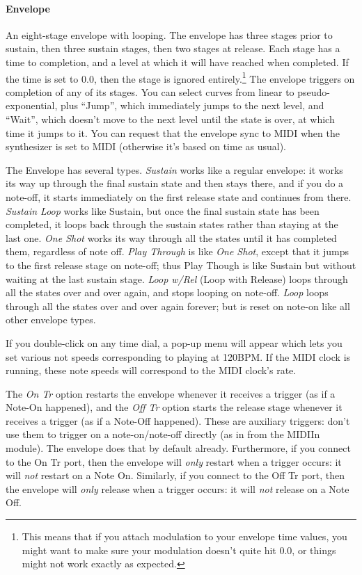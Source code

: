 \documentclass{article}
\begin{document}
\paragraph{Envelope}  An eight-stage envelope with looping.  The envelope has three stages prior to sustain, then three sustain stages, then two stages at release.  Each stage has a time to completion, and a level at which it will have reached when completed.  If the time is set to 0.0, then the stage is ignored entirely.\footnote{This means that if you attach modulation to your envelope time values, you might want to make sure your modulation doesn't quite hit 0.0, or things might not work exactly as expected.}  The envelope triggers on completion of any of its stages.  You can select curves from linear to pseudo-exponential, plus ``Jump'', which immediately jumps to the next level, and ``Wait'', which doesn't move to the next level until the state is over, at which time it jumps to it.  You can request that the envelope sync to MIDI when the synthesizer is set to MIDI (otherwise it's based on time as usual). 

The Envelope has several types.  {\it Sustain} works like a regular envelope: it works its way up through the final sustain state and then stays there, and if you do a note-off, it starts immediately on the first release state and continues from there.  {\it Sustain Loop} works like Sustain, but once the final sustain state has been completed, it loops back through the sustain states rather than staying at the last one.  {\it One Shot} works its way through all the states until  it has completed them, regardless of note off.  {\it Play Through} is like {\it One Shot}, except that it jumps to the first release stage on note-off; thus Play Though is like Sustain but without waiting at the last sustain stage.  {\it Loop w/Rel} (Loop with Release) loops through all the states over and over again, and stops looping on note-off.  {\it Loop} loops through all the states over and over again forever; but is reset on note-on like all other envelope types.
   
If you double-click on any time dial, a pop-up menu will appear which lets you set various not speeds corresponding to playing at 120BPM.  If the MIDI clock is running, these note speeds will correspond to the MIDI clock's rate.

The {\it On Tr} option restarts the envelope whenever it receives a trigger (as if a Note-On happened), and the {\it Off Tr} option starts the release stage whenever it receives a trigger (as if a Note-Off happened).  These are auxiliary triggers: don't use them to trigger on a note-on/note-off directly (as in from the MIDIIn module).  The envelope does that by default already.  Furthermore, if you connect to the On Tr port, then the envelope will {\it only} restart when a trigger occurs: it will {\it not} restart on a Note On.  Similarly, if you connect to the Off Tr port, then the envelope will {\it only} release when a trigger occurs: it will {\it not} release on a Note Off.
\end{document}
